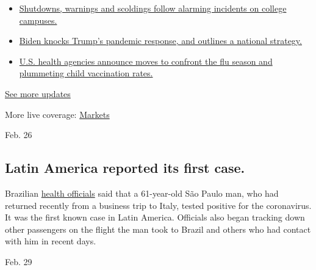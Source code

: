 \begin{itemize}
\tightlist
\item
  \href{https://www.nytimes3xbfgragh.onion/2020/08/20/world/coronavirus-covid.html?action=click\&pgtype=Article\&state=default\&region=MAIN_CONTENT_1\&context=storylines_live_updates\#link-68774d88}{Shutdowns,
  warnings and scoldings follow alarming incidents on college campuses.}
\item
  \href{https://www.nytimes3xbfgragh.onion/2020/08/20/world/coronavirus-covid.html?action=click\&pgtype=Article\&state=default\&region=MAIN_CONTENT_1\&context=storylines_live_updates\#link-26b58724}{Biden
  knocks Trump's pandemic response, and outlines a national strategy.}
\item
  \href{https://www.nytimes3xbfgragh.onion/2020/08/20/world/coronavirus-covid.html?action=click\&pgtype=Article\&state=default\&region=MAIN_CONTENT_1\&context=storylines_live_updates\#link-4e542da3}{U.S.
  health agencies announce moves to confront the flu season and
  plummeting child vaccination rates.}
\end{itemize}

\href{https://www.nytimes3xbfgragh.onion/2020/08/20/world/coronavirus-covid.html?action=click\&pgtype=Article\&state=default\&region=MAIN_CONTENT_1\&context=storylines_live_updates}{See
more updates}

More live coverage:
\href{https://www.nytimes3xbfgragh.onion/live/2020/08/20/business/stock-market-today-coronavirus?action=click\&pgtype=Article\&state=default\&region=MAIN_CONTENT_1\&context=storylines_live_updates}{Markets}

Feb. 26

\hypertarget{latin-america-reported-its-first-case}{%
\subsection{Latin America reported its first
case.}\label{latin-america-reported-its-first-case}}

Brazilian
\href{https://www.nytimes3xbfgragh.onion/2020/02/26/world/americas/brazil-italy-coronavirus.html}{health
officials} said that a 61-year-old São Paulo man, who had returned
recently from a business trip to Italy, tested positive for the
coronavirus. It was the first known case in Latin America. Officials
also began tracking down other passengers on the flight the man took to
Brazil and others who had contact with him in recent days.

Feb. 29

